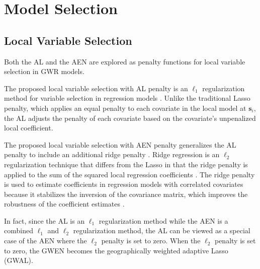 \documentclass[authoryear, review, 11pt]{elsarticle}
\begin{document}
	
	 
	
\section{Model Selection \label{section:model-selection}}
	\subsection{Local Variable Selection}
	Both the AL and the AEN are explored as penalty functions for local variable selection in GWR models.
	
	The proposed local variable selection with AL penalty is an $\ell_1$ regularization method for variable selection in regression models \citep{Zou:2006}. Unlike the traditional Lasso penalty, which applies an equal penalty to each covariate in the local model at $\bm{s}_i$, the AL adjusts the penalty of each covariate based on the covariate's unpenalized local coefficient.	
	
	The proposed local variable selection with AEN penalty generalizes the AL penalty to include an additional ridge penalty \citep{Zou:2009}. Ridge regression is an $\ell_2$ regularization technique that differs from the Lasso in that the ridge penalty is applied to the sum of the squared local regression coefficients \citep{Hoerl:1970}. The ridge penalty is used to estimate coefficients in regression models with correlated covariates because it stabilizes the inversion of the covariance matrix, which improves the robustness of the coefficient estimates \citep{Hastie:2009}.
	
	In fact, since the AL is an $\ell_1$ regularization method while the AEN is a combined $\ell_1$ and $\ell_2$ regularization method, the AL can be viewed as a special case of the AEN where the $\ell_2$ penalty is set to zero. When the $\ell_2$ penalty is set to zero, the GWEN becomes the geographically weighted adaptive Lasso (GWAL).
	
\end{document}
